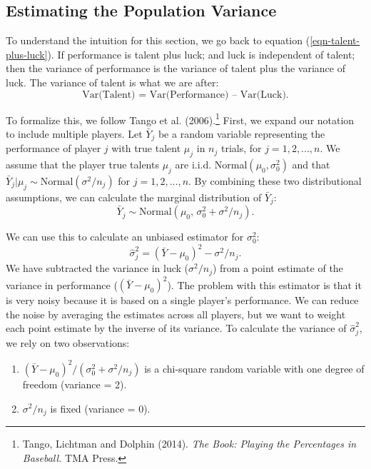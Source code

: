 \documentclass{article}
\begin{document}
  \subsection{\sc Estimating the Population Variance}

    To understand the intuition for this section, we go back to equation (\ref{eqn-talent-plus-luck}). If performance is talent plus luck; and luck is independent of talent; then the variance of performance is the variance of talent plus the variance of luck. The variance of talent is what we are after:
    \begin{equation*}
      \mbox{Var(Talent) = Var(Performance) -- Var(Luck)}.
    \end{equation*}

    To formalize this, we follow Tango et al. (2006).\footnote{Tango, Lichtman and Dolphin (2014). {\it The Book: Playing the Percentages in Baseball.} TMA Press.} First, we expand our notation to include multiple players. Let $\bar Y_j$ be a random variable representing the performance of player $j$ with true talent $\mu_j$ in $n_j$ trials, for $j = 1, 2, ..., n$. We assume that the player true talents $\mu_j$ are i.i.d. Normal$(\mu_0, \sigma^2_0)$ and that $\bar Y_j | \mu_j \sim \mbox{Normal}(\sigma^2 / n_j)$ for $j = 1, 2, ..., n$. By combining these two distributional assumptions, we can calculate the marginal distribution of $\bar Y_j$:
    \begin{equation*}
      \bar Y_j \sim \mbox{Normal}(\mu_0,\, \sigma^2_0 + \sigma^2 / n_j).
    \end{equation*}

    We can use this to calculate an unbiased estimator for $\sigma^2_0$:
    \begin{equation*}
      \hat\sigma^2_j = (\bar Y - \mu_0)^2 - \sigma^2 / n_j.
    \end{equation*}
    We have subtracted the variance in luck ($\sigma^2 / n_j$) from a point estimate of the variance in performance ($(\bar Y - \mu_0)^2$). The problem with this estimator is that it is very noisy because it is based on a single player's performance. We can reduce the noise by averaging the estimates across all players, but we want to weight each point estimate by the inverse of its variance. To calculate the variance of $\hat\sigma^2_j$, we rely on two observations:
    \begin{enumerate}
      \item $(\bar Y - \mu_0)^2 / (\sigma^2_0 + \sigma^2 / n_j)$ is a chi-square random variable with one degree of freedom (variance = 2).
      \item $\sigma^2 / n_j$ is fixed (variance = 0).
    \end{enumerate}
\end{document}
